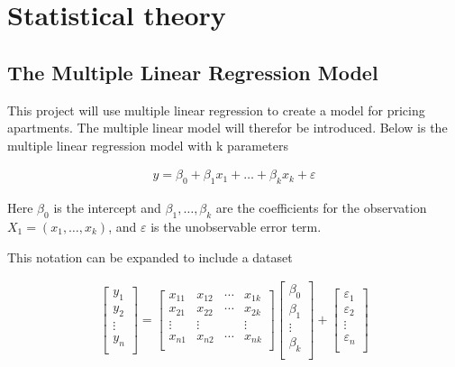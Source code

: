 \chapter{Statistical theory}\label{ch:theory}

\section{The Multiple Linear Regression Model}

This project will use multiple linear regression to create a model for pricing apartments. The multiple linear model will therefor be introduced. Below is the multiple linear regression model with k parameters 

\begin{align}
  y = \beta_0 + \beta_1 x_1 + \ldots + \beta_k x_k + \varepsilon
\end{align}

Here $\beta_0$ is the intercept and $\beta_1, \ldots, \beta_k$ are the coefficients for the observation $X_1 = (x_1, \ldots, x_k)$, and $\varepsilon$ is the unobservable error term.

This notation can be expanded to include a dataset 

\begin{align}
  \begin{bmatrix}
    y_1 \\ y_2 \\ \vdots \\ y_n \\
  \end{bmatrix}
  =
  \begin{bmatrix}
    x_{11} & x_{12} & \cdots & x_{1k} \\
    x_{21} & x_{22} & \cdots & x_{2k} \\ \vdots & \vdots & & \vdots \\ x_{n1} & x_{n2} & \cdots & x_{nk} \\
  \end{bmatrix}
  \begin{bmatrix}
    \beta_0 \\ \beta_1 \\ \vdots \\ \beta_k \\
  \end{bmatrix} +
  \begin{bmatrix}
    \varepsilon_1 \\ \varepsilon_2 \\ \vdots \\ \varepsilon_n \\
  \end{bmatrix}
\end{align}

